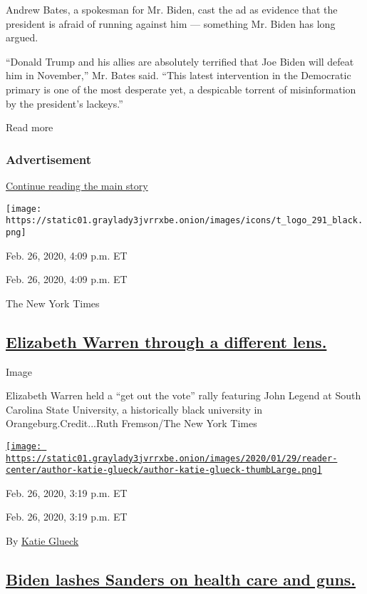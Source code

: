 Andrew Bates, a spokesman for Mr. Biden, cast the ad as evidence that
the president is afraid of running against him --- something Mr. Biden
has long argued.

``Donald Trump and his allies are absolutely terrified that Joe Biden
will defeat him in November,'' Mr. Bates said. ``This latest
intervention in the Democratic primary is one of the most desperate yet,
a despicable torrent of misinformation by the president's lackeys.''

Read more

\hypertarget{advertisement-2}{%
\subsubsection{Advertisement}\label{advertisement-2}}

\protect\hyperlink{after-dfp-ad-mid3}{Continue reading the main story}

\texttt{[image: https://static01.graylady3jvrrxbe.onion/images/icons/t\_logo\_291\_black.png]}

Feb. 26, 2020, 4:09 p.m. ET

Feb. 26, 2020, 4:09 p.m. ET

The New York Times

\hypertarget{elizabeth-warren-through-a-different-lens}{%
\subsection{\texorpdfstring{\protect\hyperlink{elizabeth-warren-john-legend}{Elizabeth
Warren through a different
lens.}}{Elizabeth Warren through a different lens.}}\label{elizabeth-warren-through-a-different-lens}}

Image

Elizabeth Warren held a ``get out the vote'' rally featuring John Legend
at South Carolina State University, a historically black university in
Orangeburg.Credit...Ruth Fremson/The New York Times

\href{https://www.nytimes3xbfgragh.onion/by/katie-glueck}{\texttt{[image: https://static01.graylady3jvrrxbe.onion/images/2020/01/29/reader-center/author-katie-glueck/author-katie-glueck-thumbLarge.png]}}

Feb. 26, 2020, 3:19 p.m. ET

Feb. 26, 2020, 3:19 p.m. ET

By \href{https://www.nytimes3xbfgragh.onion/by/katie-glueck}{Katie
Glueck}

\hypertarget{biden-lashes-sanders-on-health-care-and-guns}{%
\subsection{\texorpdfstring{\protect\hyperlink{joe-biden-bernie-sanders-guns}{Biden
lashes Sanders on health care and
guns.}}{Biden lashes Sanders on health care and guns.}}\label{biden-lashes-sanders-on-health-care-and-guns}}

